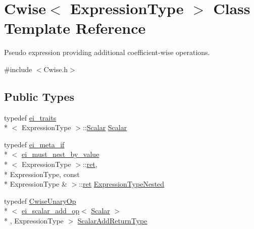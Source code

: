 \hypertarget{class_cwise}{\section{Cwise$<$ Expression\-Type $>$ Class Template Reference}
\label{class_cwise}
}


Pseudo expression providing additional coefficient-\/wise operations.  




{\ttfamily \#include $<$Cwise.\-h$>$}

\subsection*{Public Types}
\begin{DoxyCompactItemize}
\item 
typedef \hyperlink{structei__traits}{ei\-\_\-traits}\\*
$<$ Expression\-Type $>$\-::\hyperlink{class_cwise_aaa88a1b7a680bc160011b24e948bcaaf}{Scalar} \hyperlink{class_cwise_aaa88a1b7a680bc160011b24e948bcaaf}{Scalar}
\item 
typedef \hyperlink{structei__meta__if}{ei\-\_\-meta\-\_\-if}\\*
$<$ \hyperlink{structei__must__nest__by__value}{ei\-\_\-must\-\_\-nest\-\_\-by\-\_\-value}\\*
$<$ Expression\-Type $>$\-::\hyperlink{group___i_p_conn_plugin_gabc99fe6afec1a75ccff1092e47375a40}{ret}, \\*
Expression\-Type, const \\*
Expression\-Type \& $>$\-::\hyperlink{group___i_p_conn_plugin_gabc99fe6afec1a75ccff1092e47375a40}{ret} \hyperlink{class_cwise_a0eb3cc18a0d32ab3966ab0add4316e2e}{Expression\-Type\-Nested}
\item 
typedef \hyperlink{class_cwise_unary_op}{Cwise\-Unary\-Op}\\*
$<$ \hyperlink{structei__scalar__add__op}{ei\-\_\-scalar\-\_\-add\-\_\-op}$<$ \hyperlink{class_cwise_aaa88a1b7a680bc160011b24e948bcaaf}{Scalar} $>$\\*
, Expression\-Type $>$ \hyperlink{class_cwise_a89225bb17b5d6bfc9e4834590f38d61f}{Scalar\-Add\-Return\-Type}
\end{DoxyCompactItemize}
